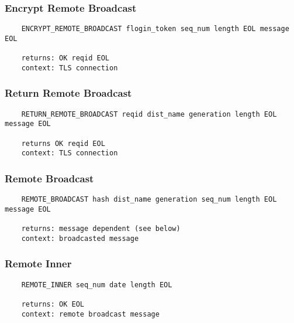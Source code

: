 \documentclass[letterpaper,11pt,oneside]{article}
\begin{document}
\subsubsection{Encrypt Remote Broadcast}

\vspace{10pt}
\begin{verbatim}
    ENCRYPT_REMOTE_BROADCAST flogin_token seq_num length EOL message EOL

    returns: OK reqid EOL
    context: TLS connection
\end{verbatim}
\vspace{10pt}

\subsubsection{Return Remote Broadcast}

\vspace{10pt}
\begin{verbatim}
    RETURN_REMOTE_BROADCAST reqid dist_name generation length EOL message EOL

    returns OK reqid EOL
    context: TLS connection
\end{verbatim}
\vspace{10pt}

\subsubsection{Remote Broadcast}

\vspace{10pt}
\begin{verbatim}
    REMOTE_BROADCAST hash dist_name generation seq_num length EOL message EOL

    returns: message dependent (see below)
    context: broadcasted message
\end{verbatim}
\vspace{10pt}

\subsubsection{Remote Inner}

\vspace{10pt}
\begin{verbatim}
    REMOTE_INNER seq_num date length EOL

    returns: OK EOL
    context: remote broadcast message
\end{verbatim}
\end{document}
